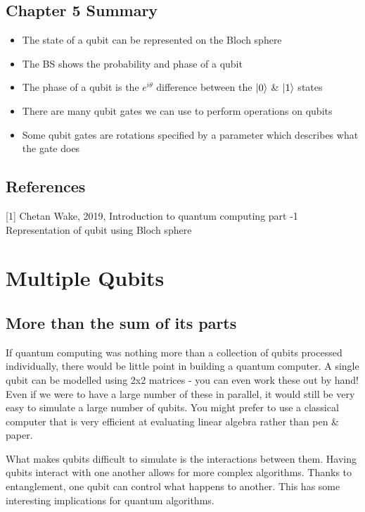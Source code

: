 \documentclass{book}
\begin{document}
\section{Chapter 5 Summary }

\begin{itemize}
    \item The state of a qubit can be represented on the Bloch sphere
    \item The BS shows the probability and phase of a qubit 
    \item The phase of a qubit is the $e^{i\theta}$ difference between the $\ket{0}$ \& $\ket{1}$ states
    \item There are many qubit gates we can use to perform operations on qubits
    \item Some qubit gates are rotations specified by a parameter which describes what the gate does
    
\end{itemize}

\section{References}

[1] Chetan Wake, 2019, Introduction to quantum computing part -1 Representation of qubit using Bloch sphere


\chapter{Multiple Qubits}

\section{ More than the sum of its parts}

If quantum computing was nothing more than a collection of qubits processed individually, there would be little point in building a quantum computer. A single qubit can be modelled using 2x2 matrices - you can even work these out by hand! Even if we were to have a large number of these in parallel, it would still be very easy to simulate a large number of qubits. You might prefer to use a classical computer that is very efficient at evaluating linear algebra rather than pen & paper. 

What makes qubits difficult to simulate is the interactions between them. Having qubits interact with one another allows for more complex algorithms. Thanks to entanglement, one qubit can control what happens to another. This has some interesting implications for quantum algorithms. 
\end{document}
